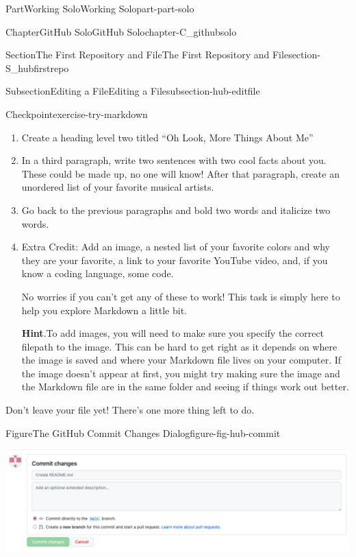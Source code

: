 \documentclass[twoside,10pt,]{book}
\newcommand{\blocktitlefont}{\relax}
\begin{document}
\begin{partptx}{Part}{Working Solo}{}{Working Solo}{}{}{part-part-solo}
\begin{chapterptx}{Chapter}{GitHub Solo}{}{GitHub Solo}{}{}{chapter-C_githubsolo}
\begin{sectionptx}{Section}{The First Repository and File}{}{The First Repository and File}{}{}{section-S_hubfirstrepo}
\begin{subsectionptx}{Subsection}{Editing a File}{}{Editing a File}{}{}{subsection-hub-editfile}
\begin{inlineexercise}{Checkpoint}{}{exercise-try-markdown}
\begin{enumerate}[font=\bfseries,label=(\alph*),ref=\alph*]
\item{}Create a heading level two titled ``Oh Look, More Things About Me''%
\item{}In a third paragraph, write two sentences with two cool facts about you. These could be made up, no one will know! After that paragraph, create an unordered list of your favorite musical artists.%
\item{}Go back to the previous paragraphs and bold two words and italicize two words.%
\item{}Extra Credit: Add an image, a nested list of your favorite colors and why they are your favorite, a link to your favorite YouTube video, and, if you know a coding language, some code.%
\par
No worries if you can't get any of these to work! This task is simply here to help you explore Markdown a little bit.%
\par\smallskip%
\noindent\textbf{\blocktitlefont Hint}.\label{hint-try-markdown-i-b}{}\hypertarget{hint-try-markdown-i-b}{}\quad{}To add images, you will need to make sure you specify the correct filepath to the image. This can be hard to get right as it depends on where the image is saved and where your Markdown file lives on your computer. If the image doesn't appear at first, you might try making sure the image and the Markdown file are in the same folder and seeing if things work out better.%
\end{enumerate}%
Don't leave your file yet! There's one more thing left to do.%
\end{inlineexercise}%
%
\begin{figureptx}{Figure}{The GitHub Commit Changes Dialog}{figure-fig-hub-commit}{}%
\begin{image}{0.15}{0.7}{0.15}{}%
\includegraphics[width=\linewidth]{external/hub_commit.pdf}
\end{image}%
\tcblower
\end{figureptx}%

\end{subsectionptx}
\end{sectionptx}
\end{chapterptx}
\end{partptx}
\end{document}
